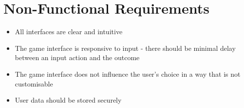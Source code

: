 \section{Non-Functional Requirements}

\begin{itemize}
    \item All interfaces are clear and intuitive
    \item The game interface is responsive to input - there should be minimal delay between an input action and the outcome
    \item The game interface does not influence the user's choice in a way that is not customisable
    \item User data should be stored securely
\end{itemize}